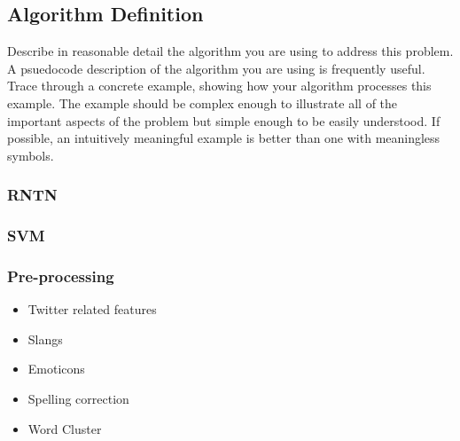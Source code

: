 \subsection{Algorithm Definition}

Describe in reasonable detail the algorithm you are using to address this problem. A psuedocode description of the algorithm you are using is frequently useful. Trace through a concrete example, showing how your algorithm processes this example. The example should be complex enough to illustrate all of the important aspects of the problem but simple enough to be easily understood. If possible, an intuitively meaningful example is better than one with meaningless symbols. 
\subsubsection{RNTN}
\subsubsection{SVM}
\subsubsection{Pre-processing}
\begin{itemize}
\item Twitter related features
\item Slangs
\item Emoticons
\item Spelling correction
\item Word Cluster
\end{itemize}
